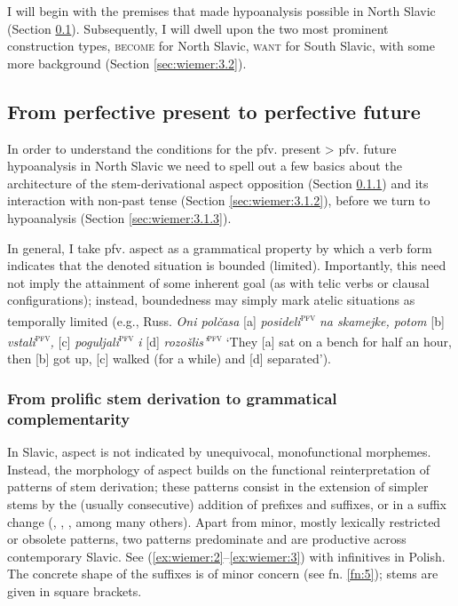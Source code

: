 \documentclass[output=paper,colorlinks,citecolor=brown]{langscibook}
\begin{document}
I will begin with the premises that made hypoanalysis possible in North Slavic (Section \ref{sec:wiemer:3.1}). Subsequently, I will dwell upon the two most prominent construction types, \textsc{become} for North Slavic, \textsc{want} for South Slavic, with some more background (Section \ref{sec:wiemer:3.2}).



\subsection{From perfective present to perfective future}\label{sec:wiemer:3.1}
In order to understand the conditions for the pfv. present > pfv. future hypoanalysis in North Slavic we need to spell out a few basics about the architecture of the stem\hyp{}derivational aspect opposition (Section \ref{sec:wiemer:3.1.1}) and its interaction with non-past tense (Section \ref{sec:wiemer:3.1.2}), before we turn to hypoanalysis (Section \ref{sec:wiemer:3.1.3}). 

In general, I take pfv. aspect as a grammatical property by which a verb form indicates that the denoted situation is bounded (limited). Importantly, this need not imply the attainment of some inherent goal (as with telic verbs or clausal configurations); instead, boundedness may simply mark atelic situations as temporally limited (e.g., Russ. \textit{Oni polčasa }[a] \textit{posideli}\textsuperscript{\textsc{pfv}}\textit{ na skamejke, potom }[b] \textit{vstali}\textsuperscript{\textsc{pfv}}\textit{, }[c]\textit{ poguljali}\textsuperscript{\textsc{pfv}}\textit{ i }[d] \textit{rozošlis’}\textsuperscript{\textsc{pfv}} ‘They [a] sat on a bench for half an hour, then [b] got up, [c] walked (for a while) and [d] separated’).


\subsubsection{From prolific stem derivation to grammatical complementarity}\label{sec:wiemer:3.1.1}
In Slavic, aspect is not indicated by unequivocal, monofunctional morphemes. Instead, the morphology of aspect builds on the functional reinterpretation of patterns of stem derivation; these patterns consist in the extension of simpler stems by the (usually consecutive) addition of prefixes and suffixes, or in a suffix change (\cite{breu_2000}, \cite{wiemer_2008}, \cite{wiemer_serzant_2017}, among many others). Apart from minor, mostly lexically restricted or obsolete patterns, two patterns predominate and are productive across contemporary Slavic. See (\ref{ex:wiemer:2}--\ref{ex:wiemer:3}) with infinitives in Polish. The concrete shape of the suffixes is of minor concern (see fn. \ref{fn:5}); stems are given in square brackets.
\end{document}

